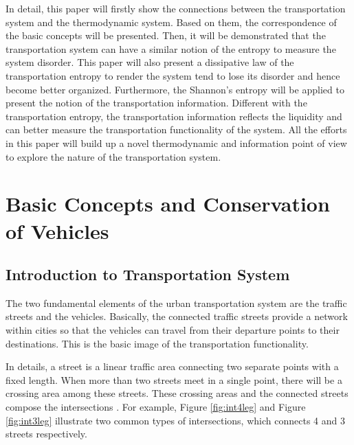 \documentclass[preprint,authoryear,12pt]{elsarticle}
\begin{document}
In detail, this paper will firstly show the connections between the transportation system and the thermodynamic system. Based on them, the correspondence of the basic concepts will be presented. Then, it will be demonstrated that the transportation system can have a similar notion of the entropy to measure the system disorder. This paper will also present a dissipative law of the transportation entropy to render the system tend to lose its disorder and hence become better organized. Furthermore, the Shannon's entropy will be applied to present the notion of the transportation information. Different with the transportation entropy, the transportation information reflects the liquidity and can better measure the transportation functionality of the system. All the efforts in this paper will build up a novel thermodynamic and information point of view to explore the nature of the transportation system.

\section{Basic Concepts and Conservation of Vehicles}

\subsection{Introduction to Transportation System}

The two fundamental elements of the urban transportation system are the traffic streets and the vehicles. Basically, the connected traffic streets provide a network within cities so that the vehicles can travel from their departure points to their destinations. This is the basic image of the transportation functionality.

In details, a street is a linear traffic area connecting two separate points with a fixed length. When more than two streets meet in a single point, there will be a crossing area among these streets. These crossing areas and the connected streets compose the intersections \citep{papageorgiou_review_2003}. For example, Figure \ref{fig:int4leg} and Figure \ref{fig:int3leg} illustrate two common types of intersections, which connects 4 and 3 streets respectively.
\end{document}

